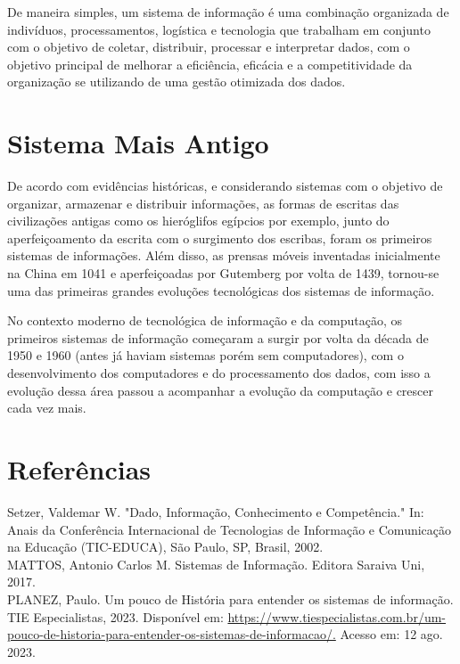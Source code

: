 \documentclass[12pt,a4paper,english,brazil]{abntex2}
\begin{document}
	De maneira simples, um sistema de informação é uma combinação organizada de indivíduos, processamentos, logística e tecnologia que trabalham em conjunto com o objetivo de coletar, distribuir, processar e interpretar dados, com o objetivo principal de melhorar a eficiência, eficácia e a competitividade da organização se utilizando de uma gestão otimizada dos dados.
	
	\section{Sistema Mais Antigo}
	
	De acordo com evidências históricas, e considerando sistemas com o objetivo de organizar, armazenar e distribuir informações, as formas de escritas das civilizações antigas como os hieróglifos egípcios por exemplo, junto do aperfeiçoamento da escrita com o surgimento dos escribas, foram os primeiros sistemas de informações. Além disso, as prensas móveis inventadas inicialmente na China em 1041 e aperfeiçoadas por Gutemberg por volta de 1439, tornou-se uma das primeiras grandes evoluções tecnológicas dos sistemas de informação.
	
	No contexto moderno de tecnológica de informação e da computação, os primeiros sistemas de informação começaram a surgir por volta da década de 1950 e 1960 (antes já haviam sistemas porém sem computadores), com o desenvolvimento dos computadores e do processamento dos dados, com isso a evolução dessa área passou a acompanhar a evolução da computação e crescer cada vez mais.\\  
	
	\section{Referências}

	Setzer, Valdemar W. "Dado, Informação, Conhecimento e Competência." In: Anais da Conferência Internacional de Tecnologias de Informação e Comunicação na Educação (TIC-EDUCA), São Paulo, SP, Brasil, 2002.\\

	MATTOS, Antonio Carlos M. Sistemas de Informação. Editora Saraiva Uni, 2017.\\
	
	PLANEZ, Paulo. Um pouco de História para entender os sistemas de informação. TIE Especialistas, 2023. Disponível em: \url{https://www.tiespecialistas.com.br/um-pouco-de-historia-para-entender-os-sistemas-de-informacao/.} Acesso em: 12 ago. 2023.
	
\end{document}
